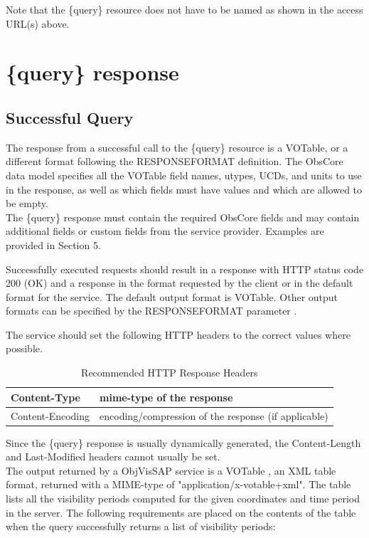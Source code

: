 \documentclass[11pt,a4paper]{ivoatex/ivoa}
\begin{document}
Note that the \{query\} resource does not have to be named as shown in
the access URL(s) above.

\section{\{query\} response}

\subsection{Successful Query}
The response from a successful call to the \{query\} resource is a
VOTable, or a different format following the RESPONSEFORMAT definition.
The ObsCore data model specifies all the VOTable \citep{2019ivoa.spec.1021O}
field names, utypes, UCDs, and units to use in the response, as well
as which fields must have values and which are allowed to be empty.\\
The \{query\} response must contain the required ObsCore \citep{2017ivoa.spec.0509L}
fields and may contain additional fields or custom fields from the service
provider. Examples are provided in Section 5.\par

Successfully executed requests should result in a response with HTTP
status code 200 (OK) and a response in the format requested by the
client or in the default format for the service. The default output
format is VOTable. Other output formats can be specified by the
RESPONSEFORMAT parameter \citep{2017ivoa.spec.0517D}.\par

The service should set the following HTTP headers to the correct values
where possible.

\begin{table}[h]
\centering
\begin{tabular}{|l|l|}
\hline
Content-Type & mime-type of the response \\
\hline
Content-Encoding & encoding/compression of the response (if applicable)
\\
\hline
\end{tabular}
\caption{Recommended HTTP Response Headers}
\end{table}
\par
Since the \{query\} response is usually dynamically generated, the
Content-Length and Last-Modified headers cannot usually be set.\\

The output returned by a ObjVisSAP service is a VOTable , an XML table
format, returned with a MIME-type of "application/x-votable+xml". The
table lists all the visibility periods computed for the given
coordinates and time period in the server. The following requirements
are placed on the contents of the table when the query successfully
returns a list of visibility periods:
\end{document}
